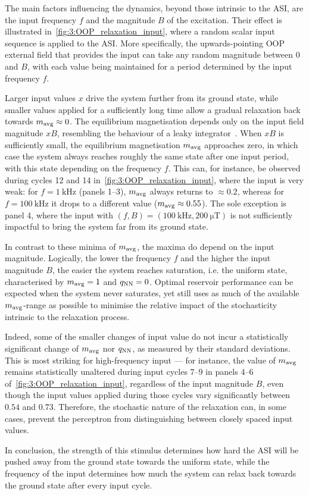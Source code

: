 The main factors influencing the dynamics, beyond those intrinsic to the ASI, are the input frequency $f$ and the magnitude $B$ of the excitation.
Their effect is illustrated in~\cref{fig:3:OOP_relaxation_input}, where a random scalar input sequence is applied to the ASI.
More specifically, the upwards-pointing OOP external field that provides the input can take any random magnitude between 0 and $B$, with each value being maintained for a period determined by the input frequency $f$. \par %
Larger input values $x$ drive the system further from its ground state, while smaller values applied for a sufficiently long time allow a gradual relaxation back towards $m_\mathrm{avg} \approx 0$.
The equilibrium magnetisation depends only on the input field magnitude $xB$, resembling the behaviour of a leaky integrator~\cite{jaeger2001echo}.
When $xB$ is sufficiently small, the equilibrium magnetisation $m_\mathrm{avg}$ approaches zero, in which case the system always reaches roughly the same state after one input period, with this state depending on the frequency $f$.
This can, for instance, be observed during cycles 12 and 14 in~\cref{fig:3:OOP_relaxation_input}, where the input is very weak: for $f=\SI{1}{\kilo\hertz}$ (panels 1--3), $m_\mathrm{avg}$ always returns to $\approx 0.2$, whereas for $f=\SI{100}{\kilo\hertz}$ it drops to a different value ($m_\mathrm{avg} \approx 0.55$).
The sole exception is panel 4, where the input with $(f,B)=(\SI{100}{\kilo\hertz}, \SI{200}{\micro\tesla})$ is not sufficiently impactful to bring the system far from its ground state. \par
In contrast to these minima of $m_\mathrm{avg}$, the maxima do depend on the input magnitude.
Logically, the lower the frequency $f$ and the higher the input magnitude $B$, the easier the system reaches saturation, i.e. the uniform state, characterised by $m_\mathrm{avg}=1$ and $q_\mathrm{NN}=0$.
Optimal reservoir performance can be expected when the system never saturates, yet still uses as much of the available $m_\mathrm{avg}$-range as possible to minimise the relative impact of the stochasticity intrinsic to the relaxation process. \par
Indeed, some of the smaller changes of input value do not incur a statistically significant change of $m_\mathrm{avg}$ nor $q_\mathrm{NN}$, as measured by their standard deviations.
This is most striking for high-frequency input --- for instance, the value of $m_\mathrm{avg}$ remains statistically unaltered during input cycles 7--9 in panels 4--6 of~\cref{fig:3:OOP_relaxation_input}, regardless of the input magnitude $B$, even though the input values applied during those cycles vary significantly between $0.54$ and $0.73$.
Therefore, the stochastic nature of the relaxation can, in some cases, prevent the perceptron from distinguishing between closely spaced input values. \par
In conclusion, the strength of this stimulus determines how hard the ASI will be pushed away from the ground state towards the uniform state, while the frequency of the input determines how much the system can relax back towards the ground state after every input cycle.

